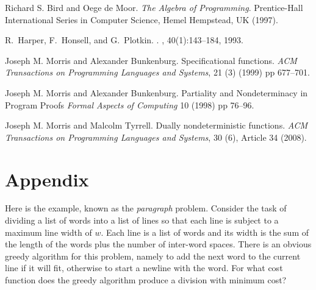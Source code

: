 \documentclass{llncs}
\newcommand{\Varid}[1]{\mathit{#1}}
\begin{document}
\begin{thebibliography}{99}


Richard S. Bird and Oege de Moor. 
\newblock \emph{The Algebra of Programming}.
\newblock Prentice-Hall International Series in Computer Science, Hemel
Hempstead, UK (1997).

R.~Harper, F.~Honsell, and G.~Plotkin.
.
,
  40(1):143--184, 1993.

Joseph M. Morris and Alexander Bunkenburg. 
\newblock Specificational functions.
\newblock \emph{ACM Transactions on Programming Languages and Systems},
21 (3) (1999) pp 677--701.

Joseph M. Morris and Alexander Bunkenburg. 
\newblock Partiality and Nondeterminacy in Program Proofs
\newblock\emph{Formal Aspects of Computing} 10 (1998) pp 76--96.

Joseph M. Morris and Malcolm Tyrrell.
\newblock Dually nondeterministic functions.
\newblock\emph{ACM Transactions on Programming Languages and Systems},
30 (6), Article 34 (2008).

\end{thebibliography}

\section*{Appendix}


Here is the example, known as the \emph{paragraph} problem. Consider the task of dividing 
a list of words into a list of lines so that each line is subject to a maximum line width 
of \ensuremath{\Varid{w}}. Each line is a list of words and its width is the sum of the length of the words 
plus the number of inter-word spaces. There is an obvious greedy algorithm for this problem, 
namely to add the next word to the current line if it will fit, otherwise to start a newline 
with the word. For what cost function does the greedy algorithm produce a division with 
minimum cost?
\end{document}
